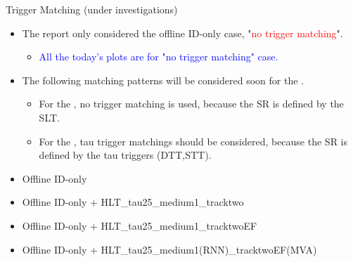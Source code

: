 \documentclass[aspectratio=46, dvipdfmx, 10pt, t]{beamer} %
\begin{document}
\begin{frame}{Trigger Matching (under investigations)}
  \vspace{5mm}
  \begin{itemize}
    \item The report only considered the offline ID-only case, "\textcolor{red}{no trigger matching}".\\
      \begin{itemize}
        \item \textcolor{blue}{All the today's plots are for "no trigger matching" case.}
      \end{itemize}

    \item The following matching patterns will be considered soon for the \hadhad.
      \begin{itemize}
        \item For the \lephad, no trigger matching is used, because the SR is defined by the SLT.
        \item For the \hadhad, tau trigger matchings should be considered, because the SR is defined by the tau triggers (DTT,STT).
      \end{itemize}
  \end{itemize}
  \vspace{5mm}

  \begin{itemize}
    \item Offline ID-only
    \item Offline ID-only + HLT\_tau25\_medium1\_tracktwo
    \item Offline ID-only + HLT\_tau25\_medium1\_tracktwoEF
    \item Offline ID-only + HLT\_tau25\_medium1(RNN)\_tracktwoEF(MVA)
  \end{itemize}

\end{frame}
\end{document}
